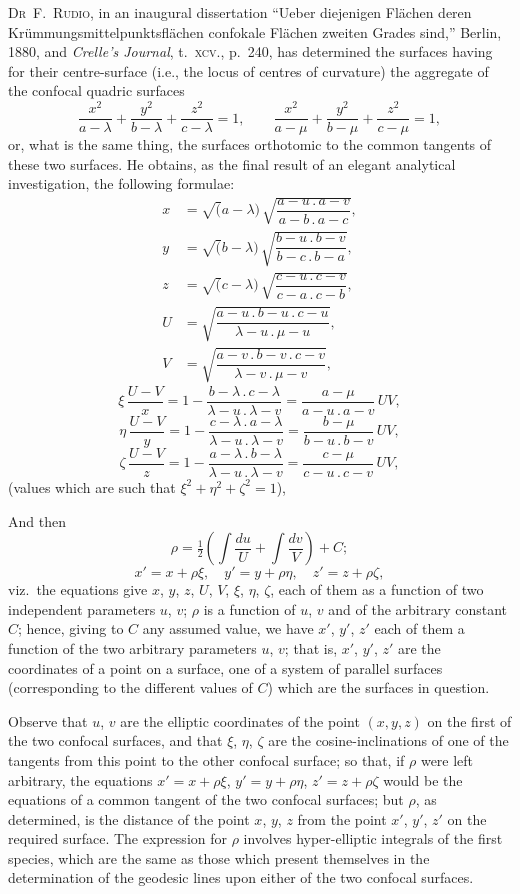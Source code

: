 \documentclass[11pt]{article}
\begin{document}
\noindent\textsc{Dr~F.~Rudio}, in an inaugural dissertation ``Ueber diejenigen Fl\"achen deren Kr\"ummungsmittelpunktsfl\"achen confokale Fl\"achen zweiten Grades sind,'' Berlin, 1880, and \textit{Crelle's Journal}, t.~\textsc{xcv}., p.~240, has determined the surfaces having for their centre-surface (i.e., the locus of centres of curvature) the aggregate of the confocal quadric surfaces
\[
\frac{x^{2}}{a-\lambda} + \frac{y^{2}}{b-\lambda} + \frac{z^{2}}{c-\lambda} = 1, \qquad
\frac{x^{2}}{a-\mu} + \frac{y^{2}}{b-\mu} + \frac{z^{2}}{c-\mu} = 1,
\]
or, what is the same thing, the surfaces orthotomic to the common tangents of these two surfaces. He obtains, as the final result of an elegant analytical investigation, the following formulae:
\begin{align*}
x &= \surd(a-\lambda)\,\sqrt{\dfrac{a-u\,.\,a-v}{a-b\,.\,a-c}}, \\
y &= \surd(b-\lambda)\,\sqrt{\dfrac{b-u\,.\,b-v}{b-c\,.\,b-a}}, \\
z &= \surd(c-\lambda)\,\sqrt{\dfrac{c-u\,.\,c-v}{c-a\,.\,c-b}}, \\
U &= \sqrt{\dfrac{a-u\,.\,b-u\,.\,c-u}{\lambda-u\,.\,\mu-u}}, \\
V &= \sqrt{\dfrac{a-v\,.\,b-v\,.\,c-v}{\lambda-v\,.\,\mu-v}},
\end{align*}
\[
\xi\,\frac{U-V}{x} = 1 - \frac{b-\lambda\,.\,c-\lambda}{\lambda-u\,.\,\lambda-v} = \frac{a-\mu}{a-u\,.\,a-v}\,UV,
\]
\[
\eta\,\frac{U-V}{y} = 1 - \frac{c-\lambda\,.\,a-\lambda}{\lambda-u\,.\,\lambda-v} = \frac{b-\mu}{b-u\,.\,b-v}\,UV,
\]
\[
\zeta\,\frac{U-V}{z} = 1 - \frac{a-\lambda\,.\,b-\lambda}{\lambda-u\,.\,\lambda-v} = \frac{c-\mu}{c-u\,.\,c-v}\,UV,
\]
(values which are such that $\xi^{2} + \eta^{2} + \zeta^{2} = 1$),

\noindent And then
\[
\rho = \tfrac{1}{2}\left(\int\!\frac{du}{U} + \int\!\frac{dv}{V}\right) + C ;
\]
\[
x' = x + \rho\xi,\quad y' = y + \rho\eta,\quad z' = z + \rho\zeta,
\]
viz.\ the equations give $x$, $y$, $z$, $U$, $V$, $\xi$, $\eta$, $\zeta$, each of them as a function of two independent parameters $u$, $v$; $\rho$ is a function of $u$, $v$ and of the arbitrary constant $C$; hence, giving to $C$ any assumed value, we have $x'$, $y'$, $z'$ each of them a function of the two arbitrary parameters $u$, $v$; that is, $x'$, $y'$, $z'$ are the coordinates of a point on a surface, one of a system of parallel surfaces (corresponding to the different values of $C$) which are the surfaces in question.

Observe that $u$, $v$ are the elliptic coordinates of the point $(x, y, z)$ on the first of the two confocal surfaces, and that $\xi$, $\eta$, $\zeta$ are the cosine-inclinations of one of the tangents from this point to the other confocal surface; so that, if $\rho$ were left arbitrary, the equations $x' = x + \rho\xi$, $y' = y + \rho\eta$, $z' = z + \rho\zeta$ would be the equations of a common tangent of the two confocal surfaces; but $\rho$, as determined, is the distance of the point $x$, $y$, $z$ from the point $x'$, $y'$, $z'$ on the required surface. The expression for $\rho$ involves hyper-elliptic integrals of the first species, which are the same as those which present themselves in the determination of the geodesic lines upon either of the two confocal surfaces.
\end{document}
